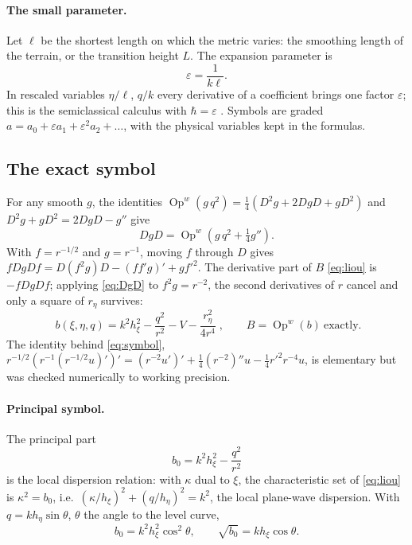 \documentclass[11pt]{article}
\newcommand{\Op}{\operatorname{Op}^w}
\begin{document}
\paragraph{The small parameter.} Let $\ell$ be the shortest length on which
the metric varies: the smoothing length of the terrain, or the transition
height $L$. The expansion parameter is
\begin{equation}\label{eq:eps}
\varepsilon=\frac1{k\ell} .
\end{equation}
In rescaled variables $\eta/\ell$, $q/k$ every derivative of a coefficient
brings one factor $\varepsilon$; this is the semiclassical calculus with
$\hbar=\varepsilon$ \cite{zworski,dimassi}. Symbols are graded
$a=a_0+\varepsilon a_1+\varepsilon^2a_2+\dots$, with the physical variables
kept in the formulas.

\subsection{The exact symbol}
For any smooth $g$, the identities
$\Op(g\,q^2)=\tfrac14(D^2g+2DgD+gD^2)$ and
$D^2g+gD^2=2DgD-g''$ give
\begin{equation}\label{eq:DgD}
DgD=\Op\!\left(g\,q^2+\tfrac14 g''\right).
\end{equation}
With $f=r^{-1/2}$ and $g=r^{-1}$, moving $f$ through $D$ gives
$fDgDf=D(f^2g)D-(ff'g)'+gf'^2$. The derivative part of $B$ \eqref{eq:liou} is
$-fDgDf$; applying \eqref{eq:DgD} to $f^2g=r^{-2}$, the second derivatives of
$r$ cancel and only a square of $r_\eta$ survives:
\begin{equation}\label{eq:symbol}
\boxed{\;b(\xi,\eta,q)=k^2h_\xi^2-\frac{q^2}{r^2}-V-\frac{r_\eta^2}{4r^4}\;},
\qquad B=\Op(b)\ \text{exactly}.
\end{equation}
The identity behind \eqref{eq:symbol},
$r^{-1/2}(r^{-1}(r^{-1/2}u)')'=(r^{-2}u')'+\tfrac14(r^{-2})''u
-\tfrac14r'^2r^{-4}u$, is elementary but was checked numerically to working
precision.

\paragraph{Principal symbol.} The principal part
\begin{equation}\label{eq:b0}
b_0=k^2h_\xi^2-\frac{q^2}{r^2}
\end{equation}
is the local dispersion relation: with $\kappa$ dual to $\xi$, the
characteristic set of \eqref{eq:liou} is $\kappa^2=b_0$, i.e.\
$(\kappa/h_\xi)^2+(q/h_\eta)^2=k^2$, the local plane-wave dispersion. With
$q=kh_\eta\sin\theta$, $\theta$ the angle to the level curve,
\begin{equation}\label{eq:angle}
b_0=k^2h_\xi^2\cos^2\theta,\qquad \sqrt{b_0}=kh_\xi\cos\theta .
\end{equation}
\end{document}
